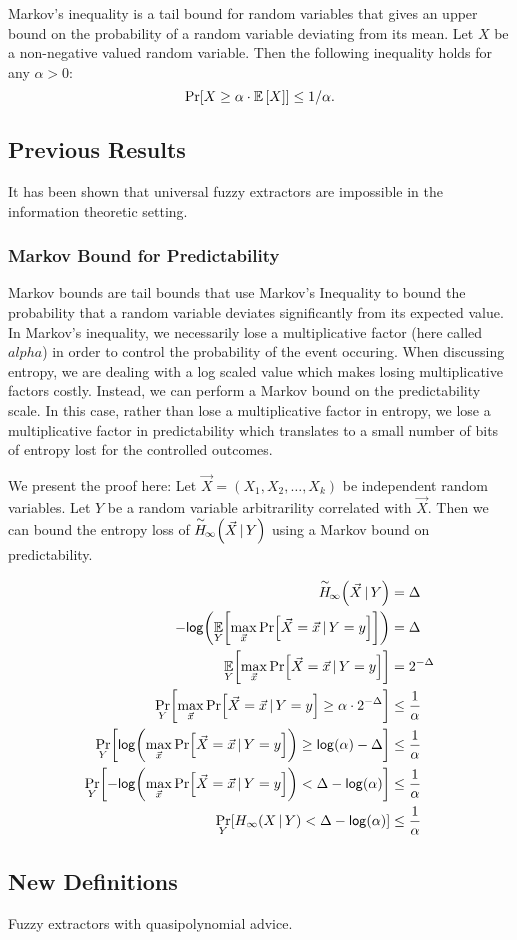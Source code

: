 \begin{definition}
    Markov's inequality is a tail bound for random variables that gives an upper bound on the probability of a random variable deviating from its mean. Let $X$ be a non-negative valued random variable. Then the following inequality holds for any $\alpha > 0$: 
    \[ 
      \Pr\!\left[X \geq \alpha \cdot \operatorname*{\mathbb{E}}\left[X\right]\right] \leq 1/\alpha .
    \]
\end{definition}

\subsection{Previous Results}
It has been shown that universal fuzzy extractors are impossible in the information theoretic setting. 

\subsubsection{Markov Bound for Predictability}
Markov bounds are tail bounds that use Markov's Inequality to bound the probability that a random variable deviates significantly from its expected value. In Markov's inequality, we necessarily lose a multiplicative factor (here called $alpha$) in order to control the probability of the event occuring. When discussing entropy, we are dealing with a log scaled value which makes losing multiplicative factors costly. Instead, we can perform a Markov bound on the predictability scale. In this case, rather than lose a multiplicative factor in entropy, we lose a multiplicative factor in predictability which translates to a small number of bits of entropy lost for the controlled outcomes.

We present the proof here:
Let $\vec{X} = (X_1, X_2, \ldots, X_k)$ be independent random variables. Let $Y$ be a random variable arbitrarility correlated with $\vec{X}$. Then we can bound the entropy loss of $\overset{\sim}{H}\!_{\infty}\!\left(\vec{X}\,|\,Y\right)$ using a Markov bound on predictability. 

\begin{align}
    \acminent{\vec{X}}{Y} &= \Delta\\
    -\log{\Exlim{Y}{\max\limits_{\vec{x}} \Prob{\Vec{X} = \vec{x} \,|\, Y = y}}} &= \Delta\\
    \Exlim{Y}{\max\limits_{\vec{x}} \Prob{\Vec{X} = \vec{x} \,|\, Y = y}} &= 2^{-\Delta}\\
    \Problim{Y}{\max\limits_{\vec{x}} \Prob{\Vec{X} = \vec{x} \,|\, Y = y} \geq \alpha \cdot 2^{-\Delta}} &\leq \frac{1}{\alpha} \\
    \Problim{Y}{\log{\max\limits_{\vec{x}} \Prob{\Vec{X} = \vec{x} \,|\, Y = y}} \geq \log{\alpha} -\Delta} &\leq \frac{1}{\alpha} \\
    \Problim{Y}{-\log{\max\limits_{\vec{x}} \Prob{\Vec{X} = \vec{x} \,|\, Y = y}} < \Delta -\log{\alpha}} &\leq \frac{1}{\alpha} \\
    \Problim{Y}{\minent{X\, |\, Y} < \Delta -\log{\alpha}} &\leq \frac{1}{\alpha}
\end{align}

\subsection{New Definitions}
Fuzzy extractors with quasipolynomial advice. 